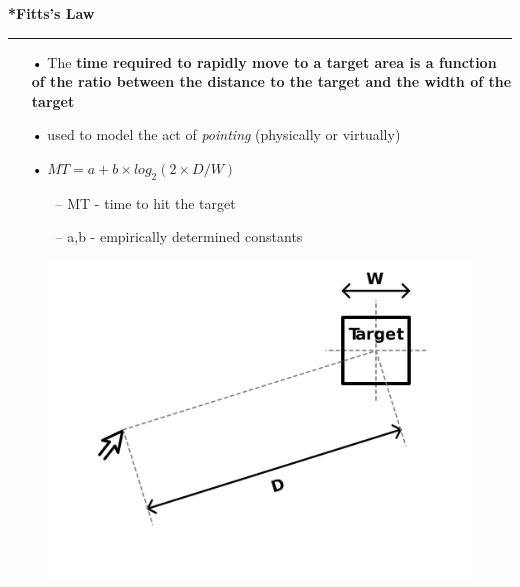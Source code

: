 \documentclass[pdf]{beamer}
\begin{document}
\begin{frame}
\vspace{8mm}
\textcolor{myBlue}{\textbf{\Large{*Fitts's Law}}}

\textcolor{red}{\rule{10cm}{1mm}}

  \begin{itemize}
  	\item[\textcolor{black}{•}] The \textbf{time required to rapidly move to a target area is a function of the ratio between the distance to the target and the width of the target}
  	\newline
  	
  	\item[\textcolor{black}{•}] used to model the act of \textit{pointing} (physically or virtually)
  	\newline
  	
  	\item[\textcolor{black}{•}] $MT = a + b \times log_2(2 \times D/W)$
  	\begin{itemize}
  		\item[--] MT - time to hit the target
  		\item[--] a,b - empirically determined constants
  	\end{itemize}
  \end{itemize}

  \begin{figure}
  \includegraphics[scale=0.1]{Fitts_Law.png}
  \end{figure}
  
\end{frame}
\end{document}
